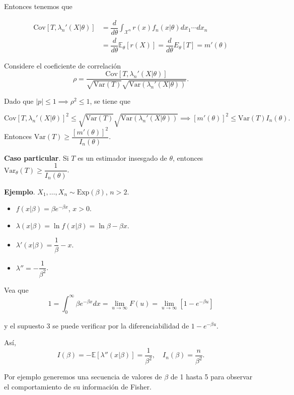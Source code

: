 \documentclass[
  12pt,
]{book}
\begin{document}
Entonces tenemos que

\begin{align*}
\text{Cov}[T,\lambda_n'(X|\theta)] 
& =  \dfrac d{d\theta}\int_{\mathcal X^n}r(x)f_n(x|\theta)dx_1\cdots dx_n\\
& = \dfrac{d}{d\theta}\mathbb E_\theta[r(X)] = \dfrac{d}{d\theta}E_\theta[T] = m'(\theta)
\end{align*}

Considere el coeficiente de correlación
\[\rho = \dfrac{\text{Cov}[T,\lambda_n'(X|\theta)] }{\sqrt{\text{Var}(T)}\sqrt{\text{Var}(\lambda_n'(X|\theta))}}.\]

Dado que \(|p|\leq 1 \implies \rho^2 \leq 1\), se tiene que

\[\text{Cov}[T,\lambda_n'(X|\theta)]^2 \leq \sqrt{\text{Var}(T)}\sqrt{\text{Var}(\lambda_n'(X|\theta))} \implies [m'(\theta)]^2 \leq \text{Var}(T) I_n(\theta). \]
Entonces \(\text{Var}(T)\geq \dfrac{[m'(\theta)]^2 }{I_n(\theta)}\).

\textbf{Caso particular}. Si \(T\) es un estimador insesgado de \(\theta\), entonces \(\text{Var}_\theta(T)\geq \dfrac{1 }{I_n(\theta)}\).

\textbf{Ejemplo}. \(X_1,\dots, X_n \sim \text{Exp}(\beta)\), \(n>2\).

\begin{itemize}
\item
  \(f(x|\beta) = \beta e^{-\beta x}\), \(x>0\).
\item
  \(\lambda(x|\beta) = \ln f(x|\beta) = \ln \beta -\beta x\).
\item
  \(\lambda'(x|\beta) = \dfrac 1\beta -x.\)
\item
  \(\lambda'' = -\dfrac 1{\beta^2}\).
\end{itemize}

Vea que
\[1 = \int_{0}^\infty \beta e^{-\beta x}dx = \lim_{u\to \infty}F(u) = \lim_{u\to \infty}[1-e^{-\beta u}]\]

y el supuesto 3 se puede verificar por la diferenciabilidad de \(1-e^{-\beta u}\).

Así,
\[I(\beta) = -\mathbb E[\lambda''(x|\beta)] = \dfrac 1{\beta^2}, \quad I_n(\beta) = \dfrac{n}{\beta^2}.\]

Por ejemplo generemos una secuencia de valores de \(\beta\) de 1 hasta 5 para
observar el comportamiento de su información de Fisher.
\end{document}
